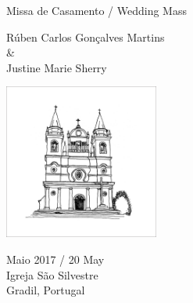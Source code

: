 \centering

\vspace*{20pt}

{\Large
  \bfseries

  Missa de Casamento / Wedding Mass
}

\vspace{20pt}


{
  \large
  Rúben Carlos Gonçalves Martins \\
  \& \\
  Justine Marie Sherry\\
}

{
  \vspace{40pt}
  \includegraphics[width=2in]{mass_pic.jpg}
}

{\small
  \vspace{20pt}

  Maio 2017 / 20 May\\
  Igreja São Silvestre\\
  Gradil, Portugal

}


